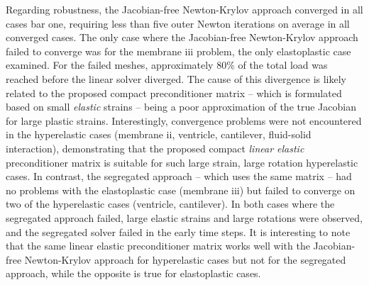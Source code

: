 \documentclass[sn-mathphys,Numbered]{sn-jnl}%
\begin{document}
%

Regarding robustness, the Jacobian-free Newton-Krylov approach converged in all cases bar one, requiring less than five outer Newton iterations on average in all converged cases.
The only case where the Jacobian-free Newton-Krylov approach failed to converge was for the membrane iii problem, the only elastoplastic case examined.
For the failed meshes, approximately 80\% of the total load was reached before the linear solver diverged.
The cause of this divergence is likely related to the proposed compact preconditioner matrix -- which is formulated based on small \emph{elastic} strains -- being a poor approximation of the true Jacobian for large plastic strains.
Interestingly, convergence problems were not encountered in the hyperelastic cases (membrane ii, ventricle, cantilever, fluid-solid interaction), demonstrating that the proposed compact \emph{linear elastic} preconditioner matrix is suitable for such large strain, large rotation hyperelastic cases.
In contrast, the segregated approach -- which uses the same matrix -- had no problems with the elastoplastic case (membrane iii) but failed to converge on two of the hyperelastic cases (ventricle, cantilever).
In both cases where the segregated approach failed, large elastic strains and large rotations were observed, and the segregated solver failed in the early time steps.
It is interesting to note that the same linear elastic preconditioner matrix works well with the Jacobian-free Newton-Krylov approach for hyperelastic cases but not for the segregated approach, while the opposite is true for elastoplastic cases.
\end{document}
